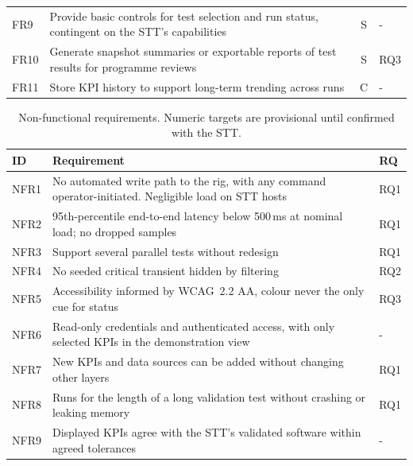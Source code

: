 \begin{table}[H]
\begin{tabularx}{\columnwidth}{lYcl}
        FR9  & Provide basic controls for test selection and run status, contingent on the STT's capabilities & S & - \\
        FR10 & Generate snapshot summaries or exportable reports of test results for programme reviews & S & RQ3 \\
        FR11 & Store KPI history to support long-term trending across runs                                                                                         & C        & -  \\
        \bottomrule
    \end{tabularx}
\end{table}

\begin{table}[H]
    \centering\small
    \caption{Non-functional requirements. Numeric targets are provisional until confirmed with the STT.}
    \label{tab:nfr}
    \begin{tabularx}{\columnwidth}{lYl}
        \toprule
        ID   & Requirement                                                                                                              & RQ  \\
        \midrule
        NFR1 & No automated write path to the rig, with any command operator-initiated.
        Negligible load on STT hosts & RQ1 \\
        NFR2 & 95th-percentile end-to-end latency below 500\,ms at nominal load; no dropped samples & RQ1 \\
        NFR3 & Support several parallel tests without redesign                                                    & RQ1 \\
        NFR4 & No seeded critical transient hidden by filtering                                                      & RQ2 \\
        NFR5 & Accessibility informed by WCAG~2.2 AA, colour never the only cue for status                                                & RQ3 \\
        NFR6 & Read-only credentials and authenticated access, with only selected KPIs in the demonstration view & - \\
        NFR7 & New KPIs and data sources can be added without changing other layers & RQ1 \\
        NFR8 & Runs for the length of a long validation test without crashing or leaking memory & RQ1 \\
        NFR9 & Displayed KPIs agree with the STT's validated software within agreed tolerances & - \\
        \bottomrule
    \end{tabularx}
\end{table}

